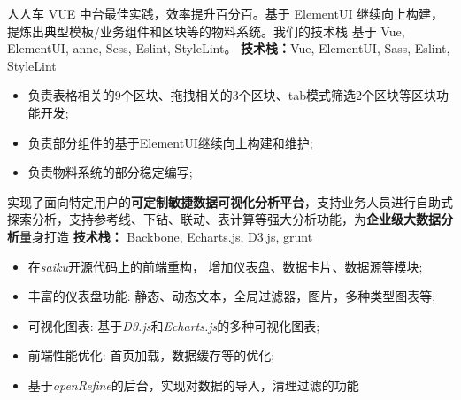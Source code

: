 \documentclass{resume}
\begin{document}



\begin{onehalfspacing}
人人车 VUE 中台最佳实践，效率提升百分百。基于 ElementUI 继续向上构建，提炼出典型模板/业务组件和区块等的物料系统。我们的技术栈 基于 Vue, ElementUI, anne, Scss, Eslint, StyleLint。
\textbf{技术栈：}Vue, ElementUI, Sass, Eslint, StyleLint
\begin{itemize}
  \item 负责表格相关的9个区块、拖拽相关的3个区块、tab模式筛选2个区块等区块功能开发;
  \item 负责部分组件的基于ElementUI继续向上构建和维护;
  \item 负责物料系统的部分稳定编写;
\end{itemize}
\end{onehalfspacing}


\begin{onehalfspacing}
实现了面向特定用户的\textbf{可定制敏捷数据可视化分析平台}，支持业务人员进行自助式探索分析，支持参考线、下钻、联动、表计算等强大分析功能，为\textbf{企业级大数据分析}量身打造
\textbf{技术栈：} Backbone, Echarts.js, D3.js, grunt
\begin{itemize}
  \item 在\textit{saiku}开源代码上的前端重构， 增加仪表盘、数据卡片、数据源等模块;
  \item 丰富的仪表盘功能: 静态、动态文本，全局过滤器，图片，多种类型图表等;
  \item 可视化图表: 基于\textit{D3.js}和\textit{Echarts.js}的多种可视化图表;
  \item 前端性能优化: 首页加载，数据缓存等的优化;
  \item 基于\textit{openRefine}的后台，实现对数据的导入，清理过滤的功能
\end{itemize}
\end{onehalfspacing}
\end{document}
